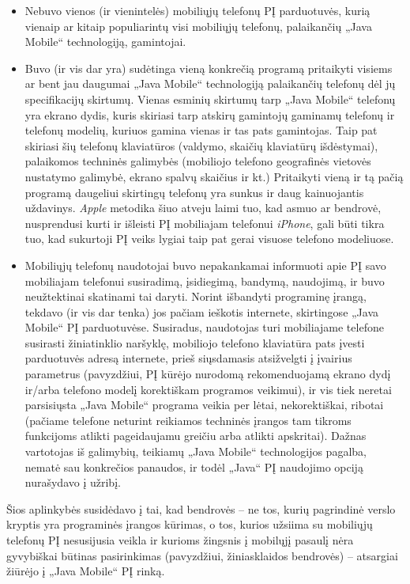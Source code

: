 \documentclass[kursinis-darbas]{vukf}
\begin{document}
\begin{itemize}
	\item Nebuvo vienos (ir vienintelės) mobiliųjų telefonų PĮ parduotuvės, kurią vienaip ar kitaip populiarintų visi mobiliųjų telefonų, palaikančių „Java Mobile“ technologiją, gamintojai.
	\item Buvo (ir vis dar yra) sudėtinga vieną konkrečią programą pritaikyti visiems ar bent jau daugumai „Java Mobile“ technologiją palaikančių telefonų dėl jų specifikacijų skirtumų. Vienas esminių skirtumų tarp „Java Mobile“ telefonų yra ekrano dydis, kuris skiriasi tarp atskirų gamintojų gaminamų telefonų ir telefonų modelių, kuriuos gamina vienas ir tas pats gamintojas. Taip pat skiriasi šių telefonų klaviatūros (valdymo, skaičių klaviatūrų išdėstymai), palaikomos techninės galimybės (mobiliojo telefono geografinės vietovės nustatymo galimybė, ekrano spalvų skaičius ir kt.) Pritaikyti vieną ir tą pačią programą daugeliui skirtingų telefonų yra sunkus ir daug kainuojantis uždavinys. \emph{Apple} metodika šiuo atveju laimi tuo, kad asmuo ar bendrovė, nusprendusi kurti ir išleisti PĮ mobiliajam telefonui \emph{iPhone}, gali būti tikra tuo, kad sukurtoji PĮ veiks lygiai taip pat gerai visuose telefono modeliuose.
	\item Mobiliųjų telefonų naudotojai buvo nepakankamai informuoti apie PĮ savo mobiliajam telefonui susiradimą, įsidiegimą, bandymą, naudojimą, ir buvo neužtektinai skatinami tai daryti. Norint išbandyti programinę įrangą, tekdavo (ir vis dar tenka) jos pačiam ieškotis internete, skirtingose „Java Mobile“ PĮ parduotuvėse. Susiradus, naudotojas turi mobiliajame telefone susirasti žiniatinklio naršyklę, mobiliojo telefono klaviatūra pats įvesti parduotuvės adresą internete, prieš siųsdamasis atsižvelgti į įvairius parametrus (pavyzdžiui, PĮ kūrėjo nurodomą rekomenduojamą ekrano dydį ir/arba telefono modelį korektiškam programos veikimui), ir vis tiek neretai parsisiųsta „Java Mobile“ programa veikia per lėtai, nekorektiškai, ribotai (pačiame telefone neturint reikiamos techninės įrangos tam tikroms funkcijoms atlikti pageidaujamu greičiu arba atlikti apskritai). Dažnas vartotojas iš galimybių, teikiamų „Java Mobile“ technologijos pagalba, nematė sau konkrečios panaudos, ir todėl „Java“ PĮ naudojimo opciją nurašydavo į užribį.
\end{itemize}

Šios aplinkybės susidėdavo į tai, kad bendrovės – ne tos, kurių pagrindinė verslo kryptis yra programinės įrangos kūrimas, o tos, kurios užsiima su mobiliųjų telefonų PĮ nesusijusia veikla ir kurioms žingsnis į mobilųjį pasaulį nėra gyvybiškai būtinas pasirinkimas (pavyzdžiui, žiniasklaidos bendrovės) – atsargiai žiūrėjo į „Java Mobile“ PĮ rinką.
\end{document}
